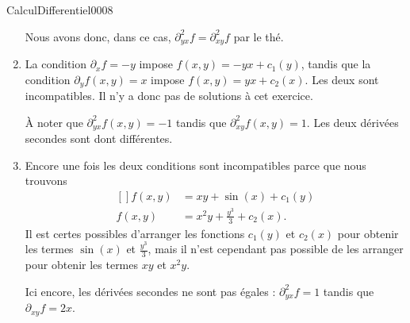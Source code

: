 \begin{corrige}{CalculDifferentiel0008}
\begin{enumerate}
			Nous avons donc, dans ce cas, $\partial^2_{yx}f=\partial^2_{xy}f$ par le thé.

		\item
			La condition $\partial_xf=-y$ impose $f(x,y)=-yx+c_1(y)$, tandis que la condition $\partial_yf(x,y)=x$ impose $f(x,y)=yx+c_2(x)$. Les deux sont incompatibles. Il n'y a donc pas de solutions à cet exercice.

			À noter que $\partial^2_{yx}f(x,y)=-1$ tandis que $\partial^2_{xy}f(x,y)=1$. Les deux dérivées secondes sont dont différentes.
		\item
			Encore une fois les deux conditions sont incompatibles parce que nous trouvons
			\begin{equation}
				\begin{aligned}[]
					f(x,y)&=xy+\sin(x)+c_1(y)\\
					f(x,y)&=x^2y+\frac{ y^3 }{ 3 }+c_2(x).
				\end{aligned}
			\end{equation}
			Il est certes possibles d'arranger les fonctions $c_1(y)$ et $c_2(x)$ pour obtenir les termes $\sin(x)$ et $\frac{ y^3 }{ 3 }$, mais il n'est cependant pas possible de les arranger pour obtenir les termes $xy$ et $x^2y$.

			Ici encore, les dérivées secondes ne sont pas égales : $\partial^2_{yx}f=1$ tandis que $\partial_{xy}f=2x$.


	\end{enumerate}
	

\end{corrige}
